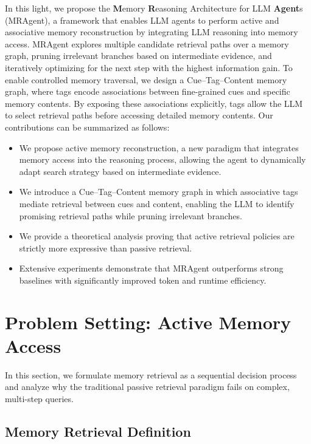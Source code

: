 \documentclass{llmxive}
\begin{document}
In this light, we propose the \textbf{M}emory \textbf{R}easoning Architecture for LLM \textbf{Agent}s (MRAgent), a framework that enables LLM agents to perform active and associative memory reconstruction by integrating LLM reasoning into memory access.
MRAgent explores multiple candidate retrieval paths over a memory graph, pruning irrelevant branches based on intermediate evidence, and iteratively optimizing for the next step with the highest information gain.
To enable controlled memory traversal, we design a Cue–Tag–Content memory graph, where tags encode associations between fine-grained cues and specific memory contents. By exposing these associations explicitly, tags allow the LLM to select retrieval paths before accessing detailed memory contents.
Our contributions can be summarized as follows:
\begin{itemize}
    \item We propose active memory reconstruction, a new paradigm that integrates memory access into the reasoning process, allowing the agent to dynamically adapt  search strategy based on intermediate evidence.
    \item We introduce a Cue–Tag–Content memory graph in which associative tags mediate retrieval between cues and content, enabling the LLM to identify promising retrieval paths while pruning irrelevant branches.
    \item We provide a theoretical analysis proving that active retrieval policies are strictly more expressive than passive retrieval.
    \item Extensive experiments demonstrate that MRAgent outperforms strong baselines with significantly improved token and runtime efficiency.
\end{itemize}

\section{Problem Setting: Active Memory Access}
\label{sec:problem-setting}

In this section, we formulate memory retrieval as a sequential decision process and analyze why the traditional passive retrieval paradigm fails on complex, multi-step queries.

\subsection{Memory Retrieval Definition}
\end{document}
